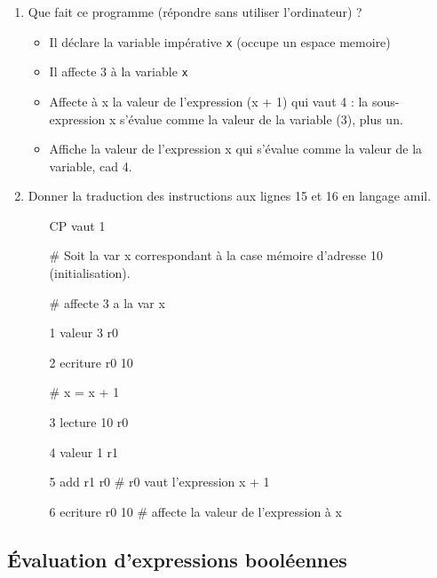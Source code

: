 \begin{enumerate}
\item Que fait ce programme (répondre sans utiliser l'ordinateur) ?
  \begin{correction}
    \begin{itemize}
    \item Il déclare la variable impérative \verb|x| (occupe un espace memoire)
    \item Il affecte 3 à la variable \verb|x|
    \item Affecte à x la valeur de l'expression (x + 1) qui vaut 4 : la sous-expression x s'évalue comme la valeur de la variable (3), plus un. 
    \item Affiche la valeur de l'expression x qui s'évalue comme la valeur de la variable, cad 4.
    \end{itemize}
  \end{correction}
\item Donner la traduction des instructions aux lignes 15 et 16 en langage amil.
  \begin{correction}
    \begin{itemize}
    \item[] CP vaut 1
    \item[\#]  Soit la var x correspondant à la case mémoire d'adresse 10 (initialisation).
    \item[\#] affecte 3 a la var x
    \item[1] valeur 3 r0
    \item[2] ecriture r0 10
    \item[\#] x = x + 1
    \item[3] lecture 10 r0
    \item[4] valeur 1 r1
    \item[5] add r1 r0 \# r0 vaut l'expression x + 1
    \item[6] ecriture r0 10 \# affecte la valeur de l'expression à x
    \end{itemize}
  \end{correction}
\end{enumerate}



\subsection{Évaluation d'expressions booléennes}
\label{intro}

